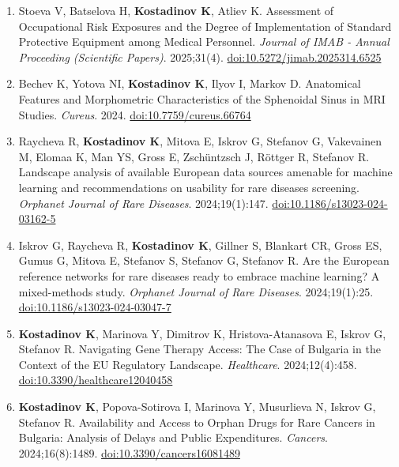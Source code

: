 \documentclass[
  10.5pt,
  a4paper,
  DIV=11,
  numbers=noendperiod]{scrartcl}
\begin{document}
\begin{enumerate}
  Attitudes and Benefits of Training with Virtual Reality Glasses Among
  Nursing Students and Educators (in Bulgarian). \emph{Management and
  Education (Управление и образование)}. 2025;21:5.
  \href{https://www.conference-burgas.com/maevolumes/vol21_2025/book\%205_25.pdf}{link}
\item
  Stoeva V, Batselova H, \textbf{Kostadinov K}, Atliev K. Assessment of
  Occupational Risk Exposures and the Degree of Implementation of
  Standard Protective Equipment among Medical Personnel. \emph{Journal
  of IMAB - Annual Proceeding (Scientific Papers)}. 2025;31(4).
  \href{https://doi.org/10.5272/jimab.2025314.6525}{doi:10.5272/jimab.2025314.6525}
\item
  Bechev K, Yotova NI, \textbf{Kostadinov K}, Ilyov I, Markov D.
  Anatomical Features and Morphometric Characteristics of the Sphenoidal
  Sinus in MRI Studies. \emph{Cureus}. 2024.
  \href{https://doi.org/10.7759/cureus.66764}{doi:10.7759/cureus.66764}
\item
  Raycheva R, \textbf{Kostadinov K}, Mitova E, Iskrov G, Stefanov G,
  Vakevainen M, Elomaa K, Man YS, Gross E, Zschüntzsch J, Röttger R,
  Stefanov R. Landscape analysis of available European data sources
  amenable for machine learning and recommendations on usability for
  rare diseases screening. \emph{Orphanet Journal of Rare Diseases}.
  2024;19(1):147.
  \href{https://doi.org/10.1186/s13023-024-03162-5}{doi:10.1186/s13023-024-03162-5}
\item
  Iskrov G, Raycheva R, \textbf{Kostadinov K}, Gillner S, Blankart CR,
  Gross ES, Gumus G, Mitova E, Stefanov S, Stefanov G, Stefanov R. Are
  the European reference networks for rare diseases ready to embrace
  machine learning? A mixed-methods study. \emph{Orphanet Journal of
  Rare Diseases}. 2024;19(1):25.
  \href{https://doi.org/10.1186/s13023-024-03047-7}{doi:10.1186/s13023-024-03047-7}
\item
  \textbf{Kostadinov K}, Marinova Y, Dimitrov K, Hristova-Atanasova E,
  Iskrov G, Stefanov R. Navigating Gene Therapy Access: The Case of
  Bulgaria in the Context of the EU Regulatory Landscape.
  \emph{Healthcare}. 2024;12(4):458.
  \href{https://doi.org/10.3390/healthcare12040458}{doi:10.3390/healthcare12040458}
\item
  \textbf{Kostadinov K}, Popova-Sotirova I, Marinova Y, Musurlieva N,
  Iskrov G, Stefanov R. Availability and Access to Orphan Drugs for Rare
  Cancers in Bulgaria: Analysis of Delays and Public Expenditures.
  \emph{Cancers}. 2024;16(8):1489.
  \href{https://doi.org/10.3390/cancers16081489}{doi:10.3390/cancers16081489}

\end{enumerate}
\end{document}
